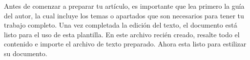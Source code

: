     
    
    
    
    
    
    
    
    Antes de comenzar a preparar tu artículo, es importante que lea primero la guía del autor, la cual incluye los temas o apartados que son necesarios para tener tu trabajo completo.
    Una vez completada la edición del texto, el documento está listo para el uso de esta plantilla. En este archivo recién creado, resalte todo el contenido e importe el archivo de texto preparado. Ahora esta listo para estilizar su documento.
    
